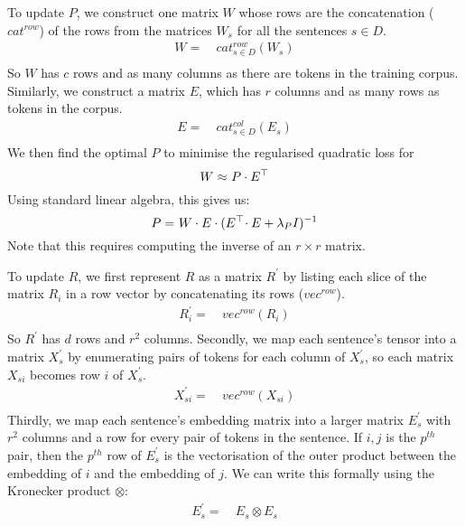 \documentclass[11pt,a4paper]{article}
\newcommand{\trans}{{}^{\top}}
\newcommand{\by}{{\times}}
\newcommand{\kron}{{\otimes}}
\begin{document}
To update $P$, we construct one matrix $W$ whose rows are the concatenation
($cat^{row}$) of the rows from the matrices $W_s$ for all the sentences
$s{\in}D$.
\vspace{-0.5ex}
\begin{align*}
W =~& cat^{row}_{s{\in}D}(W_s)
\\[-4ex]\nonumber
\end{align*}
So $W$ has $c$ rows and as many columns as there are tokens in the training
corpus.  Similarly, we construct a matrix $E$, which has $r$ columns and as
many rows as tokens in the corpus.
\vspace{-0.5ex}
\begin{align*}
E =~& cat^{col}_{s{\in}D}(E_s)
\\[-4ex]\nonumber
\end{align*}
We then find the optimal $P$ to minimise the regularised quadratic loss for
\vspace{-0.5ex}
\begin{align*}
W \approx~& P \cdot E\/\trans
\\[-4ex]\nonumber
\end{align*}
Using standard linear algebra, this gives us:
\vspace{-0.5ex}
\begin{align*}
P =~& W \cdot E \cdot (E\trans\! \cdot E + \lambda_P I\/)^{-1}
\\[-4ex]\nonumber
\end{align*}
Note that this requires computing the inverse of an $r\by r$ matrix.

To update $R$, we first represent $R$ as a matrix $R^\prime$ by listing each
slice of the matrix $R_i$ in a row vector by concatenating its rows
($vec^{row}$).
\vspace{-0.5ex}
\begin{align*}
R^\prime_i =~& vec^{row}(R_i)
\\[-4ex]\nonumber
\end{align*}
So $R^\prime$ has $d$ rows and $r^2$ columns.  
Secondly, we map each sentence's tensor into a matrix $X^{\prime}_{s}$ by
enumerating pairs of tokens for each column of $X^{\prime}_{s}$, so each
matrix $X_{si}$ becomes row $i$ of $X^{\prime}_{s}$.
\vspace{-0.5ex}
\begin{align*}
X^{\prime}_{si} =~& vec^{row}(X_{si})
\\[-4ex]\nonumber
\end{align*}
Thirdly, we map each sentence's embedding matrix into a larger matrix
$E^{\prime}_{s}$ with $r^2$ columns and a row for every pair of tokens in the
sentence.  If  $i,j$ is the $p^{th}$ pair, then the $p^{th}$ row of
$E^\prime_{s}$ is the vectorisation of the outer product between the embedding
of $i$ and the embedding of $j$.  We can write this formally using the
Kronecker product $\kron$:
\vspace{-0.5ex}
\begin{align*}
E^{\prime}_{s} =~& E_{s}\kron E_{s}
\\[-4ex]\nonumber
\end{align*}
\end{document}
